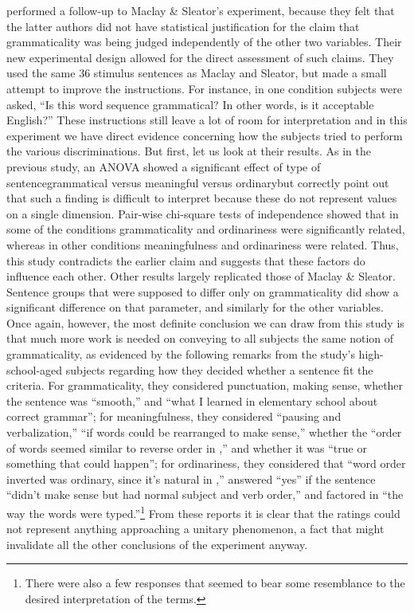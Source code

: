 \citet{VetterEtAl1979} performed a follow-up to Maclay \& Sleator's experiment, because they felt that the latter authors did not have statistical justification for the claim that grammaticality was being judged independently of the other two variables. Their new experimental design allowed for the direct assessment of such claims. They used the same 36 stimulus sentences as
Maclay
and Sleator, but made a small attempt to improve the instructions. For instance, in one condition subjects were asked, ``Is this word sequence grammatical? In other words, is it acceptable English?'' These instructions still leave a lot of room for
interpretation and in this experiment we have direct evidence concerning how the
subjects tried to perform the various discriminations. But first, let us look at their results. As in the previous study, an ANOVA showed a significant effect of type of sentence\schdash{}grammatical versus meaningful versus ordinary\schdash{}but \citeauthor{VetterEtAl1979} correctly point out that such a finding is difficult to interpret because these do not represent values on a single dimension. Pair-wise chi-square tests of independence showed that in some of the conditions grammaticality and ordinariness were significantly related, whereas in other conditions meaningfulness and ordinariness were related. Thus, this study contradicts the earlier claim and suggests that these factors do influence each other. Other results largely replicated those of Maclay \& Sleator. Sentence groups that were supposed to differ only on grammaticality did show a significant difference on that parameter, and similarly for the other variables. Once again, however, the most definite conclusion we can draw from this study is that much more work is needed on conveying to all subjects the same notion of grammaticality, as evidenced by the following remarks from the study's high-school-aged subjects regarding how they decided whether a sentence fit the criteria. For grammaticality, they considered punctuation, making sense, whether the sentence was ``smooth,'' and ``what I learned in elementary school about correct grammar''; for meaningfulness, they considered ``pausing and  verbalization,'' ``if words could be  rearranged to make sense,'' whether the ``order of words seemed similar to reverse order in ,'' and whether it was ``true or something that could happen''; for ordinariness, they considered that ``word order inverted was ordinary, since it's natural in ,'' answered ``yes'' if the sentence ``didn't make sense but had normal subject and verb order,'' and factored in ``the way the words were typed.''\footnote{There were also a few responses that seemed to bear some resemblance to the desired interpretation of the terms.}
From these reports it is clear that the ratings could not represent anything approaching a unitary phenomenon, a fact that might invalidate all the other conclusions of the experiment anyway.

